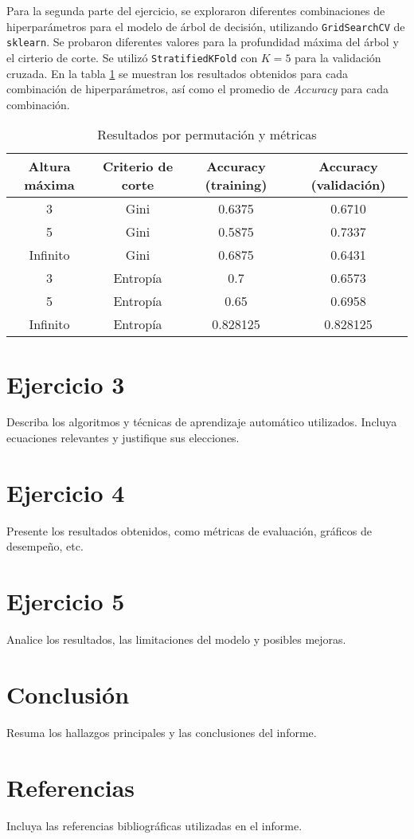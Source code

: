 \documentclass[12pt,a4paper]{article}
\begin{document}
Para la segunda parte del ejercicio, se exploraron diferentes combinaciones de hiperparámetros para el modelo de árbol de decisión, utilizando \texttt{GridSearchCV} de \texttt{sklearn}.
 Se probaron diferentes valores para la profundidad máxima del árbol y el cirterio de corte. Se utilizó \texttt{StratifiedKFold} con $K=5$ para la validación cruzada.
En la tabla \ref{tab:resultados-arbol-gridsearch-1} se muestran los resultados obtenidos para cada combinación de hiperparámetros, así como el promedio de \textit{Accuracy} para cada combinación.
 \begin{table}[H]
    \centering
    \begin{tabular}{|c|c|c|c|}
    \hline
    \textbf{Altura máxima} & \textbf{Criterio de corte} &\textbf{Accuracy} (training) &\textbf{Accuracy} (validación)  \\
    \hline
    3 & Gini   & 0.6375 & 0.6710  \\
    \hline
    5 & Gini & 0.5875 & 0.7337  \\
    \hline
    Infinito & Gini    & 0.6875 & 0.6431 \\
    \hline
    3 & Entropía & 0.7    & 0.6573  \\
    \hline
    5 & Entropía  & 0.65   & 0.6958  \\
    \hline  
    Infinito &  Entropía &  0.828125 &  0.828125 \\
    \hline
    \end{tabular}
    \caption{Resultados por permutación y métricas}
    \label{tab:resultados-arbol-gridsearch-1}
\end{table}

\section{Ejercicio 3}
Describa los algoritmos y técnicas de aprendizaje automático utilizados. Incluya ecuaciones relevantes y justifique sus elecciones.

\section{Ejercicio 4}
Presente los resultados obtenidos, como métricas de evaluación, gráficos de desempeño, etc.

\section{Ejercicio 5}
Analice los resultados, las limitaciones del modelo y posibles mejoras.

\section{Conclusión}
Resuma los hallazgos principales y las conclusiones del informe.

\section*{Referencias}
Incluya las referencias bibliográficas utilizadas en el informe.
\end{document}
